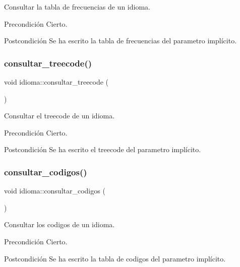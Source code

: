 Consultar la tabla de frecuencias de un idioma. 

\begin{DoxyPrecond}{Precondición}
Cierto. 
\end{DoxyPrecond}
\begin{DoxyPostcond}{Postcondición}
Se ha escrito la tabla de frecuencias del parametro implícito. 
\end{DoxyPostcond}
\mbox{\label{classidioma_aba4621fa2985a6ceba574eeeca069b8d}} 
\subsubsection{\texorpdfstring{consultar\+\_\+treecode()}{consultar\_treecode()}}
{\footnotesize\ttfamily void idioma\+::consultar\+\_\+treecode (\begin{DoxyParamCaption}{ }\end{DoxyParamCaption})}



Consultar el treecode de un idioma. 

\begin{DoxyPrecond}{Precondición}
Cierto. 
\end{DoxyPrecond}
\begin{DoxyPostcond}{Postcondición}
Se ha escrito el treecode del parametro implícito. 
\end{DoxyPostcond}
\mbox{\label{classidioma_a4e58f4dbc3845d4d8cea0c6b923a2e4e}} 
\subsubsection{\texorpdfstring{consultar\+\_\+codigos()}{consultar\_codigos()}}
{\footnotesize\ttfamily void idioma\+::consultar\+\_\+codigos (\begin{DoxyParamCaption}{ }\end{DoxyParamCaption})}



Consultar los codigos de un idioma. 

\begin{DoxyPrecond}{Precondición}
Cierto. 
\end{DoxyPrecond}
\begin{DoxyPostcond}{Postcondición}
Se ha escrito la tabla de codigos del parametro implícito. 
\end{DoxyPostcond}
\mbox{\label{classidioma_ad7342a94567fbd464ef2ee40ad1bb213}} 
